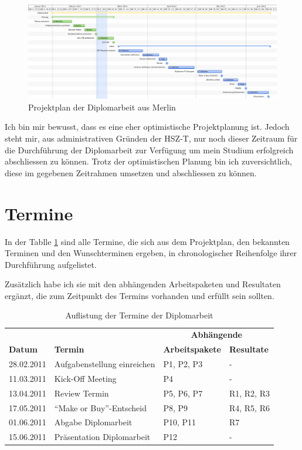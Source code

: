 \begin{figure}[htbp]
\begin{center}
\includegraphics[width=1\textwidth,angle=0]{./bilder/anhang/projektplanung.pdf}
\caption{Projektplan der Diplomarbeit aus Merlin}
\label{pic:projektplan}
\end{center}
\end{figure}

Ich bin mir bewusst, dass es eine eher optimistische Projektplanung ist. Jedoch
steht mir, aus administrativen Gründen der HSZ-T, nur noch dieser Zeitraum für
die Durchführung der Diplomarbeit zur Verfügung um mein Studium erfolgreich abschliessen
zu können. Trotz der optimistischen Planung bin ich zuversichtlich, diese
im gegebenen Zeitrahmen umsetzen und abschliessen zu können.

\section{Termine}
In der Tablle \ref{tab:termine_diplomarbeit} sind alle Termine, die sich aus 
dem Projektplan, den bekannten Terminen und den Wunschterminen ergeben, in chronologischer
Reihenfolge ihrer Durchführung aufgelistet.

Zusätzlich habe ich sie mit den abhängenden Arbeitspaketen
und Resultaten ergänzt, die zum Zeitpunkt des Termins vorhanden und erfüllt
sein sollten.

\begin{table}[htbp]
\begin{center}
    \begin{tabular}{llll}
        \toprule & & \multicolumn{2}{c}{\textbf{Abhängende}} \\
        \textbf{Datum} & \textbf{Termin} & \textbf{Arbeitspakete} & \textbf{Resultate} \\
        \midrule 28.02.2011 & Aufgabenstellung einreichen & P1, P2, P3 & - \\
        \midrule 11.03.2011 & Kick-Off Meeting & P4 & -\\
        \midrule 13.04.2011 & Review Termin & P5, P6, P7 & R1, R2, R3 \\
        \midrule 17.05.2011 & ``Make or Buy''-Entscheid & P8, P9 & R4, R5, R6 \\
        \midrule 01.06.2011 & Abgabe Diplomarbeit & P10, P11 & R7 \\
        \midrule 15.06.2011 & Präsentation Diplomarbeit & P12 & - \\
        \bottomrule
    \end{tabular}
    \caption{Auflistung der Termine der Diplomarbeit}
    \label{tab:termine_diplomarbeit}
\end{center}
\end{table}


